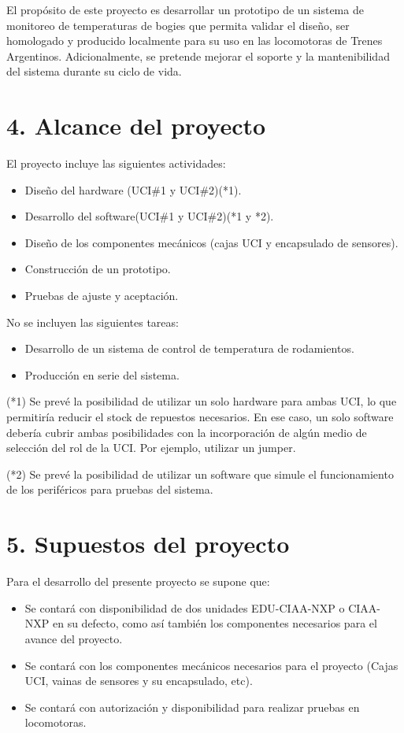 \documentclass[
11pt, %
codirector, %
]{charter}
\begin{document}
El propósito de este proyecto es desarrollar un prototipo de un sistema de monitoreo de temperaturas de bogies que permita validar el diseño, ser homologado y producido localmente para su uso en las locomotoras de Trenes Argentinos. Adicionalmente, se pretende mejorar el soporte y la mantenibilidad del sistema durante su ciclo de vida.


\section{4. Alcance del proyecto}
\label{sec:alcance}

El proyecto incluye las siguientes actividades:
\begin{itemize}
\item Diseño del hardware (UCI\#1 y UCI\#2)(*1).
\item Desarrollo del software(UCI\#1 y UCI\#2)(*1 y *2).
\item Diseño de los componentes mecánicos (cajas UCI y encapsulado de sensores).
\item Construcción de un prototipo.
\item Pruebas de ajuste y aceptación.
\end{itemize}
No se incluyen las siguientes tareas: 
\begin{itemize}
\item Desarrollo de un sistema de control de temperatura de rodamientos.
\item Producción en serie del sistema.
\end{itemize}
(*1) Se prevé la posibilidad de utilizar un solo hardware para ambas UCI, lo que permitiría reducir el stock de repuestos necesarios. En ese caso, un solo software debería cubrir ambas posibilidades con la incorporación de algún medio de selección del rol de la UCI. Por ejemplo, utilizar un jumper.

(*2) Se prevé la posibilidad de utilizar un software que simule el funcionamiento de los periféricos para pruebas del sistema.

\section{5. Supuestos del proyecto}
\label{sec:supuestos}

Para el desarrollo del presente proyecto se supone que:

\begin{itemize}
	\item Se contará con disponibilidad de dos unidades EDU-CIAA-NXP o CIAA-NXP en su defecto, como así también los componentes necesarios para el avance del proyecto.
	\item Se contará con los componentes mecánicos necesarios para el proyecto (Cajas UCI, vainas de sensores y su encapsulado, etc). 
	\item Se contará con autorización y disponibilidad para realizar pruebas en locomotoras.
\end{itemize}
\end{document}
